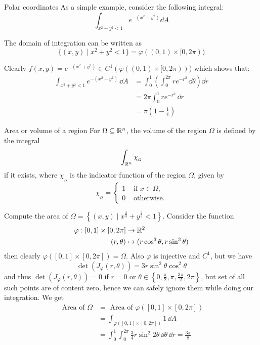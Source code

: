 \documentclass[../Analysis-3.tex]{subfiles}
\begin{document}
\begin{Eg}{Polar coordinates}{}
  As a simple example, consider the following integral:
  \[
    \int_{x^2 + y^2 < 1} e^{-(x^2+y^2)} \dd A
  \]

  The domain of integration can be written as
  \[
    \{ (x,y) \mid x^2 + y^2 < 1 \} = \varphi( (0,1) \times [0,2\pi))
  \]

  Clearly $f(x,y) = e^{-(x^2+y^2)} \in C^1(\varphi((0,1) \times [0,2\pi)))$ which shows that:
  \begin{align*}
    \int_{x^2+y^2 < 1} e^{-(x^2+y^2)} \, \dd A
     & = \int_0^1 \left( \int_0^{2\pi} re^{-r^2} \, \dd \theta \right) \dd r \\
     & = 2\pi \int_0^1 r e^{-r^2} \, \dd r                                   \\
     & = \pi \left( 1 - \frac{1}{e}\right)
  \end{align*}
\end{Eg}

\begin{Def}{Area or volume of a region}{}
  For $\Omega \subseteq \mathbb{R}^n$, the volume of the region $\Omega$ is defined by the integral
  \[
    \int_{\mathbb{R}^n} \chi_{_\Omega}
  \]
  if it exists, where $\chi_{_\Omega}$ is the indicator function of the region $\Omega$, given by
  \[
    \chi_{_\Omega} = \begin{cases}
      1 & \mbox{ if } x \in \Omega, \\
      0 & \mbox{ otherwise}.
    \end{cases}
  \]

\end{Def}

\begin{Eg}{}{}
  Compute the area of $\Omega = \left\{ (x,y) \mid x^{\frac{2}{3}} + y^{\frac{2}{3}} < 1 \right\}$. Consider the function
  \begin{align*}
    \varphi : [0,1] \times [0,2\pi] & \to \mathbb{R}^2                                 \\
    (r,\theta)                      & \mapsto ( r\cos^3\theta, r\sin^3\theta )
  \end{align*}
  then clearly $\varphi([0,1] \times [0,2\pi]) = \Omega$. Also $\varphi$ is injective and $C^1$, but we have
  \[
    \det(J_{\varphi}(r,\theta)) = 3r \sin^2\theta \cos^2\theta
  \]
  and thus $\det(J_{\varphi}(r,\theta)) = 0$ if $r = 0$ or $\theta \in \left\{ 0, \frac{\pi}{2}, \pi, \frac{3\pi}{2}, 2\pi \right\}$, but set of all such points are of content zero, hence we can safely ignore them while doing our integration. We get
  \begin{align*}
    \mbox{ Area of } \Omega
     & = \mbox{ Area of } \varphi \left( [0,1] \times [0,2\pi] \right)                               \\
     & = \int_{\varphi([0,1] \times [0,2\pi])} 1 \, \dd A                                            \\
     & = \int_0^1 \int_0^{2\pi} \frac{3}{4} r \sin^2 2\theta \, \dd \theta \, \dd r = \frac{3\pi}{8}
  \end{align*}
\end{Eg}
\end{document}

